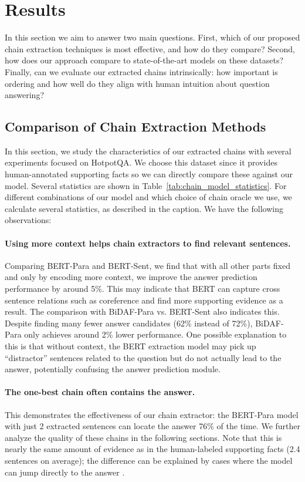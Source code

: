 \documentclass[11pt,a4paper]{article}
\begin{document}
\section{Results}

In this section we aim to answer two main questions. First, which of our proposed chain extraction techniques is most effective, and how do they compare? Second, how does our approach compare to state-of-the-art models on these datasets? Finally, can we evaluate our extracted chains intrinsically: how important is ordering and how well do they align with human intuition about question answering?


\subsection{Comparison of Chain Extraction Methods}

In this section, we study the characteristics of our extracted chains with several experiments focused on HotpotQA. We choose this dataset since it provides human-annotated supporting facts so we can directly compare these against our model. Several statistics are shown in Table~\ref{tab:chain_model_statistics}. For different combinations of our model and which choice of chain oracle we use, we calculate several statistics, as described in the caption. We have the following observations:

\paragraph{Using more context helps chain extractors to find relevant sentences.} Comparing BERT-Para and BERT-Sent, we find that with all other parts fixed and only by encoding more context, we improve the answer prediction performance by around 5\%. This may indicate that BERT can capture cross sentence relations such as coreference and find more supporting evidence as a result. The comparison with BiDAF-Para vs. BERT-Sent also indicates this. Despite finding many fewer answer candidates (62\% instead of 72\%), BiDAF-Para only achieves around 2\% lower performance. One possible explanation to this is that without context, the BERT extraction model may pick up ``distractor'' sentences related to the question but do not actually lead to the answer, potentially confusing the answer prediction module.

\paragraph{The one-best chain often contains the answer.} This demonstrates the effectiveness of our chain extractor: the BERT-Para model with just 2 extracted sentences can locate the answer 76\% of the time. We further analyze the quality of these chains in the following sections. Note that this is nearly the same amount of evidence as in the human-labeled supporting facts (2.4 sentences on average); the difference can be explained by cases where the model can jump directly to the answer \citep{chen2019understanding}.
\end{document}
